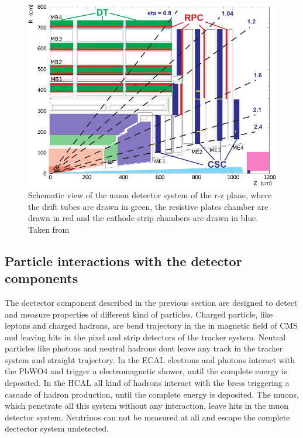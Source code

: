 \begin{figure}[ht]
	\centering
	\includegraphics[width=1\textwidth]{pictures/MUON_SYSTEM.pdf}

	\caption[Muon detector system of CMS]{Schematic view of the muon detector system of the r-z plane, where the drift tubes are drawn in green, the resistive plates chamber are drawn in red and the cathode strip chambers are drawn in blue. Taken from \cite{CMS2}}
	\label{fig:fig_2_10}
\end{figure}


\subsection{Particle interactions with the detector components}
\label{sec:section_2_2_3}

The dectector component described in the previous section are designed to detect and measure properties of different kind of particles. Charged particle, like leptons and charged hadrons, are bend trajectory in the in magnetic field of \gls{CMS} and leaving hits in the pixel and strip detectors of the tracker system. Neutral particles like photons and neutral hadrons dont leave any track in the tracker system and straight trajectory. In the \gls{ECAL} electrons and photons interact with the \gls{PbWO4} and trigger a electromagnetic shower, until the complete energy is deposited. In the \gls{HCAL} all kind of hadrons interact with the bress triggering a cascade of hadron production, until the complete energy is deposited. The muons, which penetrate all this system without any interaction, leave hits in the muon detector system. Neutrinos can not be measured at all and escape the complete dectector system undetected.


